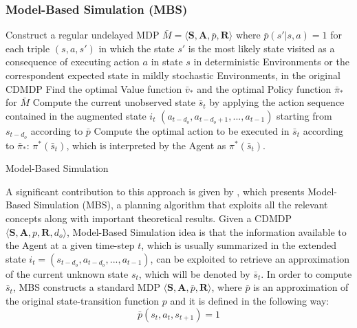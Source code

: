                 
            \subsubsection{Model-Based Simulation (MBS)}
                \begin{algorithm}[t]
                    \SetAlgoLined
                    Construct a regular undelayed MDP $\bar{M} = \langle \mathbf{S}, \mathbf{A}, \bar{p}, \mathbf{R}\rangle$ where $\bar{p}(s' | s, a) = 1$ for each triple $(s, a, s')$ in which the state $s'$ is the most likely state visited as a consequence of executing action $a$ in state $s$ in deterministic Environments or the correspondent expected state in mildly stochastic Environments, in the original CDMDP\;
                    Find the optimal Value function $\bar{v}_{*}$ and the optimal Policy function $\bar{\pi}_{*}$ for $\bar{M}$\;
                    Compute the current unobserved state $\bar{s}_t$ by applying the action sequence contained in the augmented state $i_t$ $\left(a_{t-d_{o}}, a_{t-d_{o}+1}, ...,  a_{t-1} \right)$ starting from $s_{t-d_{o}}$ according to $\bar{p}$\;
                    Compute the optimal action to be executed in $\bar{s}_t$ according to $\bar{\pi}_{*}$: $\pi^{*}(\bar{s}_t)$, which is interpreted by the Agent as $\pi^{*}(\bar{s}_t)$.
                    \caption{Model-Based Simulation}
                    \label{algo:mbs}
                \end{algorithm}
                A significant contribution to this approach is given by , which presents Model-Based Simulation (MBS), a planning algorithm that exploits all the relevant concepts along with important theoretical results. \newline
                Given a CDMDP $\langle \mathbf{S}, \mathbf{A}, p, \mathbf{R}, d_o\rangle$, Model-Based Simulation idea is that the information available to the Agent at a given time-step $t$, which is usually summarized in the extended state $i_t = \left( s_{t-d_{o}}, a_{t-d_{o}},..., a_{t-1}\right)$, can be exploited to retrieve an approximation of the current unknown state $s_t$, which will be denoted by $\bar{s}_t$. In order to compute $\bar{s}_t$, MBS constructs a standard MDP $\langle \mathbf{S}, \mathbf{A}, \bar{p}, \mathbf{R}\rangle$, where $\bar{p}$ is an approximation of the original state-transition function $p$ and it is defined in the following way:
                \[  \bar{p}(s_t, a_t, s_{t+1}) = 1 \] 
                
